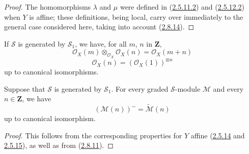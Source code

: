 \begin{proof}
The homomorphisms $\lambda$ and $\mu$ were defined in
(\hyperref[II.2.5.11.2]{2.5.11.2}) and
(\hyperref[II.2.5.12.2]{2.5.12.2}) when $Y$ is affine; these definitions,
being local, carry over immediately to the general case considered here,
taking into account (\hyperref[II.2.8.14]{2.8.14}).
\end{proof}

\begin{corollary}[3.2.7]
\label{II.3.2.7}
If $\mathcal{S}$ is generated by $\mathcal{S}_1$, we have, for all
$m$, $n$ in $\mathbf{Z}$,
\[
\label{II.3.2.7.1}
  \mathcal{O}_X(m)\otimes_{\mathcal{O}_X}\mathcal{O}_X(n)
  =\mathcal{O}_X(m+n)
\tag{3.2.7.1}
\]
\[
\label{II.3.2.7.2}
  \mathcal{O}_X(n)=(\mathcal{O}_X(1))^{\otimes n}
\tag{3.2.7.2}
\]
up to canonical isomorphisms.
\end{corollary}


\begin{corollary}[3.2.8]
\label{II.3.2.8}
Suppose that $\mathcal{S}$ is generated by $\mathcal{S}_1$. For every graded
$\mathcal{S}$-module $\mathcal{M}$ and every $n\in\mathbf{Z}$, we have
\[
\label{II.3.2.8.1}
  (\mathcal{M}(n))^{\sim}=\widetilde{\mathcal{M}}(n)
\tag{3.2.8.1}
\]
up to canonical isomorphism.
\end{corollary}

\begin{proof}
This follows from the corresponding properties for $Y$ affine
(\hyperref[II.2.5.14]{2.5.14} and
\hyperref[II.2.5.15]{2.5.15}), as well as from
(\hyperref[II.2.8.11]{2.8.11}).
\end{proof}

